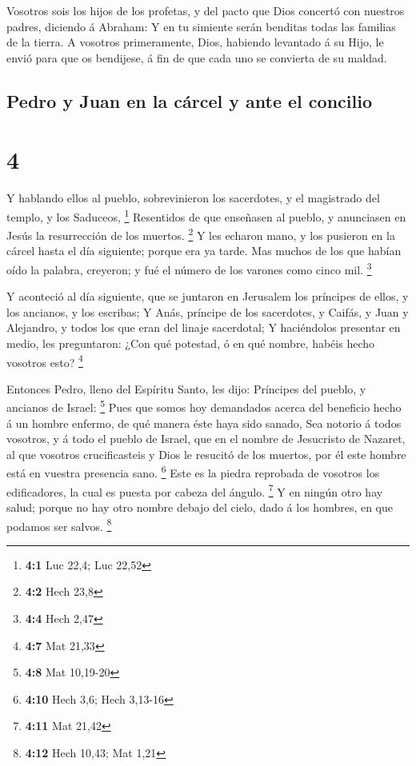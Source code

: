  Vosotros sois los hijos de los profetas, y del pacto que
Dios concertó con nuestros padres, diciendo á Abraham: Y en tu simiente
serán benditas todas las familias de la tierra.  A vosotros
primeramente, Dios, habiendo levantado á su Hijo, le envió para que os
bendijese, á fin de que cada uno se convierta de su maldad.

\hypertarget{pedro-y-juan-en-la-cuxe1rcel-y-ante-el-concilio}{%
\subsection{Pedro y Juan en la cárcel y ante el
concilio}\label{pedro-y-juan-en-la-cuxe1rcel-y-ante-el-concilio}}

\hypertarget{section-3}{%
\section{4}\label{section-3}}

 Y hablando ellos al pueblo, sobrevinieron los sacerdotes, y
el magistrado del templo, y los Saduceos, \footnote{\textbf{4:1} Luc
  22,4; Luc 22,52}  Resentidos de que enseñasen al pueblo, y
anunciasen en Jesús la resurrección de los muertos. \footnote{\textbf{4:2}
  Hech 23,8}  Y les echaron mano, y los pusieron en la
cárcel hasta el día siguiente; porque era ya tarde.  Mas
muchos de los que habían oído la palabra, creyeron; y fué el número de
los varones como cinco mil. \footnote{\textbf{4:4} Hech 2,47}

 Y aconteció al día siguiente, que se juntaron en Jerusalem
los príncipes de ellos, y los ancianos, y los escribas;  Y
Anás, príncipe de los sacerdotes, y Caifás, y Juan y Alejandro, y todos
los que eran del linaje sacerdotal;  Y haciéndolos presentar
en medio, les preguntaron: ¿Con qué potestad, ó en qué nombre, habéis
hecho vosotros esto? \footnote{\textbf{4:7} Mat 21,33}

 Entonces Pedro, lleno del Espíritu Santo, les dijo:
Príncipes del pueblo, y ancianos de Israel: \footnote{\textbf{4:8} Mat
  10,19-20}  Pues que somos hoy demandados acerca del
beneficio hecho á un hombre enfermo, de qué manera éste haya sido
sanado,  Sea notorio á todos vosotros, y á todo el pueblo
de Israel, que en el nombre de Jesucristo de Nazaret, al que vosotros
crucificasteis y Dios le resucitó de los muertos, por él este hombre
está en vuestra presencia sano. \footnote{\textbf{4:10} Hech 3,6; Hech
  3,13-16}  Este es la piedra reprobada de vosotros los
edificadores, la cual es puesta por cabeza del ángulo. \footnote{\textbf{4:11}
  Mat 21,42}  Y en ningún otro hay salud; porque no hay
otro nombre debajo del cielo, dado á los hombres, en que podamos ser
salvos. \footnote{\textbf{4:12} Hech 10,43; Mat 1,21}

